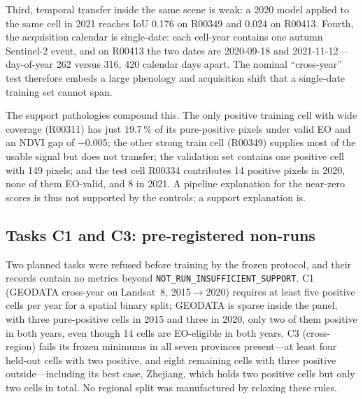 Third, temporal transfer inside the same scene is weak: a 2020 model
applied to the same cell in 2021 reaches IoU 0.176 on R00349 and 0.024
on R00413. Fourth, the acquisition calendar is single-date: each
cell-year contains one autumn Sentinel-2 event, and on R00413 the two
dates are 2020-09-18 and 2021-11-12---day-of-year 262 versus 316, 420
calendar days apart. The nominal ``cross-year'' test therefore embeds a
large phenology and acquisition shift that a single-date training set
cannot span.

The support pathologies compound this. The only positive training cell
with wide coverage (R00311) has just 19.7\,\% of its pure-positive
pixels under valid EO and an NDVI gap of $-$0.005; the other strong
train cell (R00349) supplies most of the usable signal but does not
transfer; the validation set contains one positive cell with 149
pixels; and the test cell R00334 contributes 14 positive pixels in 2020,
none of them EO-valid, and 8 in 2021. A pipeline explanation for the
near-zero scores is thus not supported by the controls; a support
explanation is.

\subsection{Tasks C1 and C3: pre-registered non-runs}
Two planned tasks were refused before training by the frozen protocol,
and their records contain no metrics beyond
\texttt{NOT\_RUN\_INSUFFICIENT\_SUPPORT}. C1 (GEODATA cross-year on
Landsat~8, 2015$\rightarrow$2020) requires at least five positive cells
per year for a spatial binary split; GEODATA is sparse inside the
panel, with three pure-positive cells in 2015 and three in 2020, only
two of them positive in both years, even though 14 cells are EO-eligible
in both years. C3 (cross-region) fails its frozen minimums in all seven
provinces present---at least four held-out cells with two positive, and
eight remaining cells with three positive outside---including its best
case, Zhejiang, which holds two positive cells but only two cells in
total. No regional split was manufactured by relaxing these rules.

